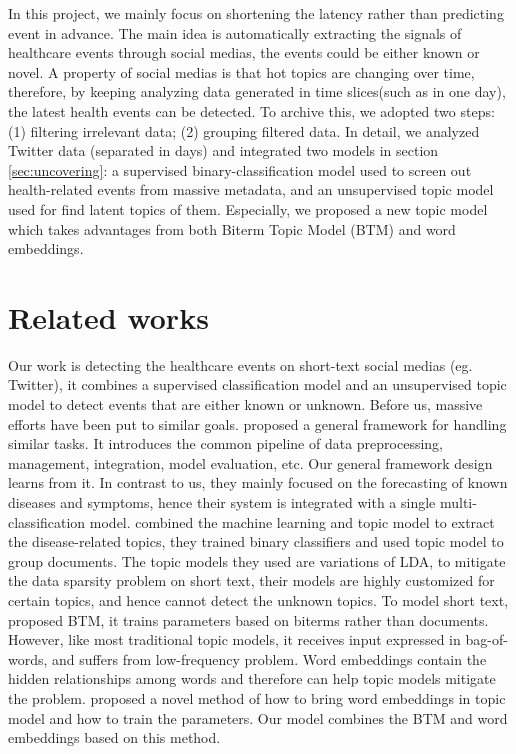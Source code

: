 In this project, we mainly focus on shortening the latency rather than predicting event in advance. The main idea is automatically extracting the signals of healthcare events through social medias, the events could be either known or novel. A property of social medias is that hot topics are changing over time, therefore, by keeping analyzing data generated in time slices(such as in one day), the latest health events can be detected. To archive this, we adopted two steps: (1) filtering irrelevant data; (2) grouping filtered data. In detail, we analyzed Twitter data (separated in days) and integrated two models in section \ref{sec:uncovering}: a supervised binary-classification model used to screen out health-related events from massive metadata, and an unsupervised topic model used for find latent topics of them. Especially, we proposed a new topic model which takes advantages from both Biterm Topic Model (BTM) \cite{yan2013biterm} and word embeddings.

\section{Related works}
Our work is detecting the healthcare events on short-text social medias (eg. Twitter), it combines a supervised classification model and an unsupervised topic model to detect events that are either known or unknown. Before us, massive efforts have been put to similar goals. \cite{serban2019real} proposed a general framework for handling similar tasks. It introduces the common pipeline of data preprocessing, management, integration, model evaluation, etc. Our general framework design learns from it. In contrast to us, they mainly focused on the forecasting of known diseases and symptoms, hence their system is integrated with a single multi-classification model. \cite{paul2011you,paul2012model,paul2014discovering,tuarob2013discovering} combined the machine learning and topic model to extract the disease-related topics, they trained binary classifiers and used topic model to group documents. The topic models they used are variations of LDA, to mitigate the data sparsity problem on short text, their models are highly customized for certain topics, and hence cannot detect the unknown topics. To model short text, \cite{yan2013biterm} proposed BTM, it trains parameters based on biterms rather than documents. However, like most traditional topic models, it receives input expressed in bag-of-words, and suffers from low-frequency problem. Word embeddings contain the hidden relationships among words and therefore can help topic models mitigate the problem. \cite{dieng2019topic} proposed a novel method of how to bring word embeddings in topic model and how to train the parameters. Our model combines the BTM and word embeddings based on this method.